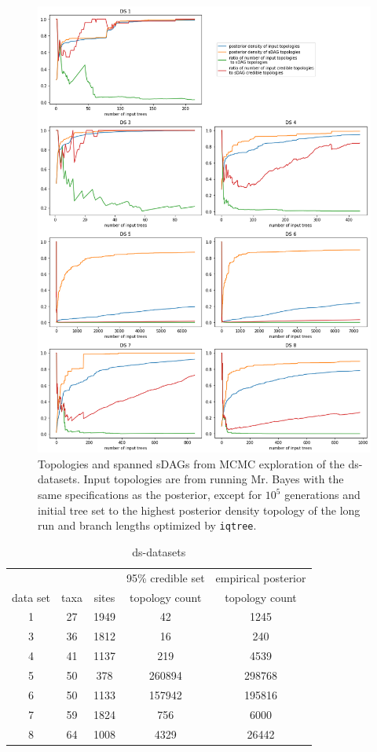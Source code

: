 \documentclass{article}
\newcommand{\iqtree}{\texttt{iqtree}}
\begin{document}
\begin{figure}[!t]\centering
\includegraphics[scale=0.35]{figures/mcmc_sdag_stats.png}
\vspace{-1ex}
\caption{Topologies and spanned sDAGs from MCMC exploration of the ds-datasets. 
Input topologies are from running Mr. Bayes with the same specifications as the posterior, except for $10^{5}$ generations and initial tree set to the highest posterior density topology of the long run and branch lengths optimized by \iqtree.}
\label{fig:mcmc_to_sdag_stats}
\end{figure}

\begin{table}\centering
\begin{tabular}{ccccc}
&&& 95\% credible set & empirical posterior
\\
data set	& taxa & sites & topology count & topology count
\\\hline
1 & 27 & 1949 & 42 & 1245
\\\hline
3 & 36 & 1812 & 16 & 240
\\\hline
4 & 41 & 1137 & 219 & 4539
\\\hline
5 & 50 & 378 & 260894 & 298768
\\\hline
6 & 50 & 1133 & 157942 & 195816
\\\hline
7 & 59 & 1824 & 756 & 6000 
\\\hline 
8 & 64 & 1008 & 4329 & 26442
\end{tabular}
\caption{ds-datasets}
\label{table:dataSetStats}
\end{table}
\end{document}
